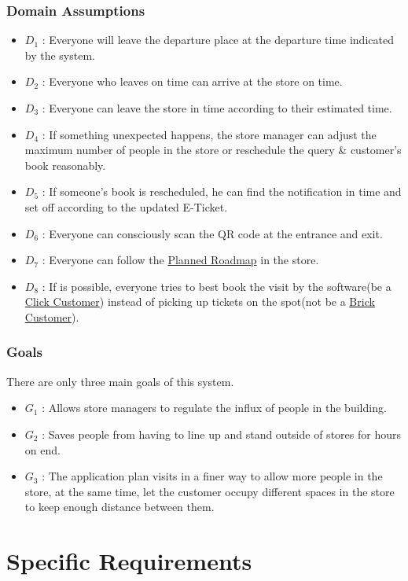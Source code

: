 \documentclass[a4paper,12pt]{book}
\begin{document}
\subsection{Domain Assumptions}
\begin{itemize}
	\item $D_1$ : Everyone will leave the departure place at the departure time indicated by the system.
	\item $D_2$ : Everyone who leaves on time can arrive at the store on time.
	\item $D_3$ : Everyone can leave the store in time according to their estimated time.
	\item $D_4$ : If something unexpected happens, the store manager can adjust the maximum number of people in the store or reschedule the query \& customer's book reasonably.
	\item $D_5$ : If someone’s book is rescheduled, he can find the notification in time and set off according to the updated E-Ticket.
	\item $D_6$ : Everyone can consciously scan the QR code at the entrance and exit.
	\item $D_7$ : Everyone can follow the \hyperref[Definitions]{Planned Roadmap} in the store.
	\item $D_8$ : If is possible, everyone tries to best book the visit by the software(be a \hyperref[Definitions]{Click Customer}) instead of picking up tickets on the spot(not be a \hyperref[Definitions]{Brick Customer}).
\end{itemize}

\subsection{Goals}
There are only three main goals of this system.
\begin{itemize}
	\item $G_1$ : Allows store managers to regulate the influx of people in the building.
	\item $G_2$ : Saves people from having to line up and stand outside of stores for hours on end.
	\item $G_3$ : The application plan visits in a finer way to allow more people in the store, at the same time, let the customer occupy different spaces in the store to keep enough distance between them.
\end{itemize}

\chapter{Specific Requirements} \label{C3:SpecificRequirements}
\end{document}
